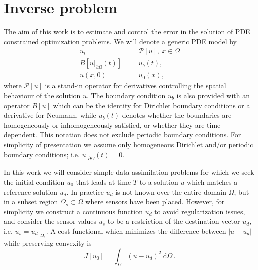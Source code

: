 \documentclass[10pt]{article}
\renewcommand{\d}{\mathrm{d}}
\newcommand{\dd}{\:\textrm{d}}
\newcommand{\CostFcn}{J}
\newcommand{\CostIntegrand}{g}
\begin{document}
\section{Inverse problem\label{sec:inverse}}
The aim of this work is to estimate and control the error in the solution of PDE constrained optimization problems. %
We will denote a generic PDE model by
\begin{eqnarray}
 u_t &=& \mathcal P[ u ] , \  x \in \Omega \\ \nonumber
   B[u|_{\partial \Omega}(t)]&=& u_b(t), \\ \nonumber
   u( x,0)&=& u_0( x),\nonumber
\label{eq:generic}\end{eqnarray} 
where $\mathcal P[ u ]$ is a stand-in operator for derivatives
controlling the spatial behaviour of the solution $u$. The boundary
condition $u_b$ is also provided with an operator $B[u]$ which can be
the identity for Dirichlet boundary conditions or a derivative for
Neumann, while $u_b(t)$ denotes whether the boundaries are
homogeneously or inhomogeneously satisfied, or whether they are time
dependent. This notation does not exclude periodic boundary
conditions. For simplicity of presentation we assume only homogeneous Dirichlet and/or periodic boundary conditions; i.e.  $u|_{\partial \Omega}(t)= 0.$

%
%

In this work we will consider simple data assimilation problems  for which we seek the initial condition $u_0$ that leads at time $T$ to a solution
$u$ which matches a reference solution $u_d$. In practice $ u_d$  is not known over the entire domain $\Omega$, but in a subset region $\Omega_s\subset \Omega$ where sensors have been placed. However, for simplicity we construct a continuous function
$u_d$ to avoid regularization issues, and consider the sensor values $u_s$ to be a restriction of the destination vector $u_d$, i.e. $u_s=u_d|_{\Omega_s}$. 
A cost functional which minimizes the difference between $| u- u_d|$ while preserving convexity is
\begin{equation}
  J[u_0]=\int_{\Omega}(u- u_d)^2 \ \d \Omega \,.  \label{eq:Cost_general}
\end{equation}
\end{document}
